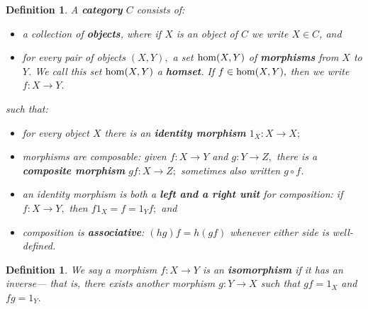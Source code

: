 \documentclass[12pt,twoside,openright]{report}
\newtheorem{definition}[thm]{Definition}
\newcommand{\maps}{\colon}
\renewcommand{\hom}{{\rm hom}}
\begin{document}
\begin{definition} A {\bf category} $C$ consists of:
\begin{itemize}
    \item a collection of {\bf objects}, where if $X$ is an object of $C$
    we write $X \in C$, and
    \item for every pair of objects $(X,Y),$ a set $\hom(X,Y)$ of 
    {\bf morphisms} from $X$ to $Y$.  We call this set $\hom(X,Y)$ a
    {\bf homset}.  If $f \in \hom(X,Y),$ then we write $f\maps X\to Y.$
\end{itemize}
such that:
\begin{itemize}
    \item for every object $X$ there is an {\bf identity morphism} $1_X\maps 
     X\to X;$
    \item morphisms are composable: given $f\maps X\to Y$ and $g\maps
    Y\to Z,$ there is a {\bf composite morphism} $gf \maps X \to Z;$
    sometimes also written $g \circ f$.
    \item an identity morphism is both a {\bf left and a right unit} for 
   composition: if $f \maps X\to Y,$ then $f 1_X = f = 1_Y f;$ and
    \item composition is {\bf associative}: $(h g) f = 
   h (g f)$ whenever either side is well-defined.
\end{itemize}
\end{definition}

\begin{definition}
  We say a morphism $f\maps X \to Y$ is an \textbf{isomorphism} if it
  has an inverse--- that is, there exists another morphism $g\maps Y
  \to X$ such that $gf = 1_X$ and $fg = 1_Y.$
\end{definition}
\end{document}
